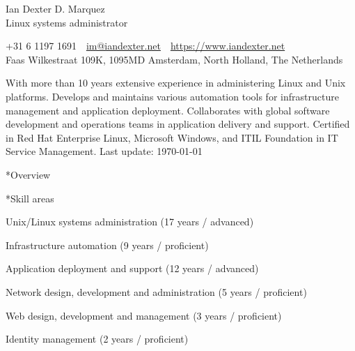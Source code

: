 \documentclass[10pt, a4paper, final]{article}
\begin{document}
\begin{center}
  \Huge Ian Dexter D. Marquez\\
  \Large Linux systems administrator
\end{center}

\begin{center}\begin{spacing}{1}\small
  +31 6 1197 1691~\textbullet~\href{mailto:im@iandexter.net}{im@iandexter.net}~\textbullet~\href{https://www.iandexter.net}{https://www.iandexter.net}\\
  Faas Wilkestraat 109K, 1095MD Amsterdam, North Holland, The Netherlands\\
  
\end{spacing}\end{center}
\vspace{1.5em}

\normalsize With more than 10 years extensive experience in administering Linux and Unix platforms. Develops and maintains various automation tools for infrastructure management and application deployment. Collaborates with global software development and operations teams in application delivery and support. Certified in Red Hat Enterprise Linux, Microsoft Windows, and ITIL Foundation in IT Service Management. \small \textcolor{dark-gray}{Last update: \textsc{\today}} \normalsize

\vspace{1em}

\begin{section}*{Overview}
  \begin{subsection}*{Skill areas}
    \begin{compactitem}
      \item Unix/Linux systems administration (17 years / advanced) 
      \item Infrastructure automation (9 years / proficient) 
      \item Application deployment and support (12 years / advanced) 
      \item Network design, development and administration (5 years / proficient) 
      \item Web design, development and management (3 years / proficient) 
      \item Identity management (2 years / proficient) 
    \end{compactitem}
  \end{subsection}
\end{section}
\end{document}
